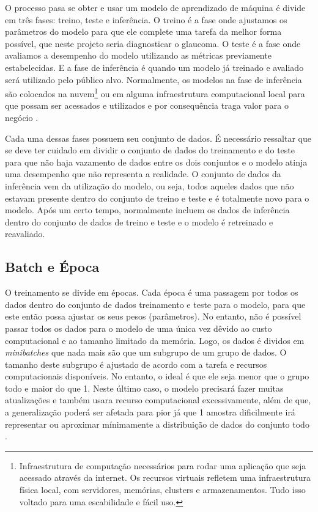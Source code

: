 \documentclass[ %
	msc, %
	portugues %
]{../ppgccufmg}
\begin{document}
    O processo pasa se obter e usar um modelo de aprendizado de máquina é divide em três fases: treino,
    teste e inferência. O treino é a fase onde ajustamos os parâmetros do modelo para que ele
    complete uma tarefa da melhor forma possível, que neste projeto seria diagnosticar o glaucoma. O
    teste é a fase onde avaliamos a desempenho do modelo utilizando as métricas previamente
    estabelecidas. E a fase de inferência é quando um modelo já treinado e avaliado será utilizado
    pelo público alvo. Normalmente, os modelos na fase de inferência são
    colocados na nuvem\footnote{Infraestrutura de computação necessários para rodar uma aplicação
    que seja acessado através da internet. Os recursos virtuais refletem uma infraestrutura física
    local, com servidores, memórias, clusters e armazenamentos. Tudo isso voltado
    para uma escabilidade e fácil uso.} ou em alguma infraestrutura computacional local para que possam ser acessados
    e utilizados e por consequência traga valor para o negócio \citep{GoodBengCour16}.

    Cada uma dessas fases possuem seu conjunto de dados. É necessário ressaltar que se deve ter
    cuidado em dividir o conjunto de dados do treinamento e do teste para que não haja vazamento de
    dados entre os dois conjuntos e o modelo atinja uma desempenho que não representa a realidade.
    O conjunto de dados da inferência vem da utilização do modelo, ou seja, todos aqueles dados
    que não estavam presente dentro do conjunto de treino e teste e é totalmente novo para o modelo.
    Após um certo tempo, normalmente incluem os dados de inferência dentro do conjunto de dados de
    treino e teste e o modelo é retreinado e reavaliado.


    \subsection{Batch e Época}\label{sec:batch}

    O treinamento se divide em épocas. Cada época é uma passagem por todos os dados dentro do
    conjunto de dados treinamento e teste para o modelo, para que este então possa ajustar os seus pesos
    (parâmetros). No entanto, não é possível passar todos os dados para o modelo de uma única vez
    dêvido ao custo computacional e ao tamanho limitado da memória.
    Logo, os dados é dividos em \textit{minibatches} que nada mais são
    que um subgrupo de um grupo de dados. O tamanho deste subgrupo é ajustado de acordo com a tarefa
    e recursos computacionais disponíveis. No entanto, o ideal é que ele seja menor que o grupo todo
    e maior do que 1. Neste último caso, o modelo precisará fazer muitas atualizações e também usara
    recurso computacional excessivamente, além de que, a generalização poderá ser afetada para pior
    já que 1 amostra dificilmente irá representar ou aproximar mínimamente a distribuição de dados
    do conjunto todo \citep{GoodBengCour16}.
\end{document}
